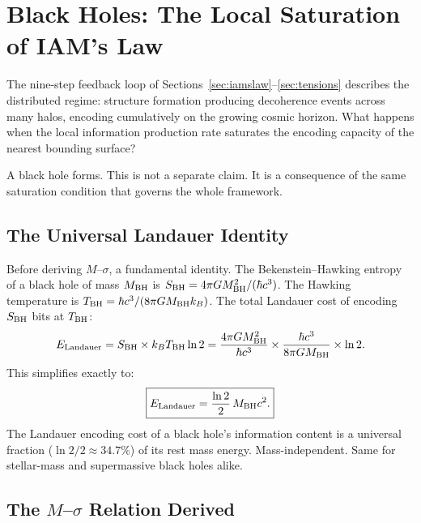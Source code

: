 \documentclass[12pt,a4paper]{article}
\begin{document}
\newpage

\section{Black Holes: The Local Saturation of IAM's Law}
\label{sec:bh}

The nine-step feedback loop of Sections~\ref{sec:iamslaw}--\ref{sec:tensions}
describes the distributed regime: structure formation producing decoherence
events across many halos, encoding cumulatively on the growing cosmic horizon.
What happens when the local information production rate saturates the encoding
capacity of the nearest bounding surface?

A black hole forms. This is not a separate claim. It is a consequence of the
same saturation condition that governs the whole framework.

\subsection{The Universal Landauer Identity}

Before deriving $M$--$\sigma$, a fundamental identity. The Bekenstein--Hawking
entropy of a black hole of mass $M_{\rm BH}$ is $S_{\rm BH} = 4\pi G M_{\rm BH}^2
/(\hbar c^3)$. The Hawking temperature is $T_{\rm BH} = \hbar c^3/(8\pi G M_{\rm BH}
k_B)$. The total Landauer cost of encoding $S_{\rm BH}$ bits at $T_{\rm BH}$:
\begin{equation}
E_{\rm Landauer} = S_{\rm BH} \times k_B T_{\rm BH} \ln 2
= \frac{4\pi G M_{\rm BH}^2}{\hbar c^3} \times \frac{\hbar c^3}{8\pi G M_{\rm BH}}
\times \ln 2.
\end{equation}
This simplifies exactly to:
\begin{equation}
\boxed{E_{\rm Landauer} = \frac{\ln 2}{2}\, M_{\rm BH} c^2.}
\end{equation}
The Landauer encoding cost of a black hole's information content is a universal
fraction ($\ln 2/2 \approx 34.7\%$) of its rest mass energy. Mass-independent.
Same for stellar-mass and supermassive black holes alike.

\subsection{The $M$--$\sigma$ Relation Derived}
\end{document}
